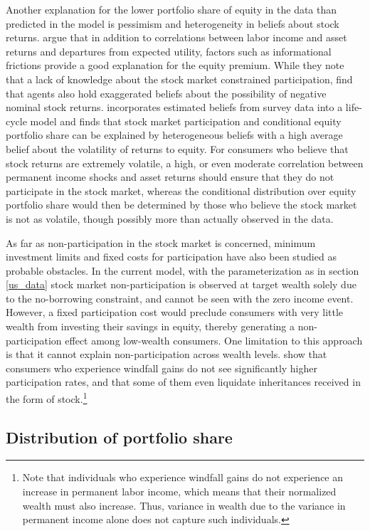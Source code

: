 Another explanation for the lower portfolio share of equity in the data than predicted in the model is pessimism and heterogeneity in beliefs about stock returns. \citet{Haliassos1995} argue that in addition to correlations between labor income and asset returns and departures from expected utility, factors such as informational frictions provide a good explanation for the equity premium. While they note that a lack of knowledge about the stock market constrained participation, \citet{Dominitz2007} find that agents also hold exaggerated beliefs about the possibility of negative nominal stock returns. \citet{Mateo2024} incorporates estimated beliefs from survey data into a life-cycle model and finds that stock market participation and conditional equity portfolio share can be explained by heterogeneous beliefs with a high average belief about the volatility of returns to equity. For consumers who believe that stock returns are extremely volatile, a high, or even moderate correlation between permanent income shocks and asset returns should ensure that they do not participate in the stock market, whereas the conditional distribution over equity portfolio share would then be determined by those who believe the stock market is not as volatile, though possibly more than actually observed in the data.

As far as non-participation in the stock market is concerned, minimum investment limits and fixed costs for participation have also been studied as probable obstacles. In the current model, with the parameterization as in section \ref{us_data} stock market non-participation is observed at target wealth solely due to the no-borrowing constraint, and cannot be seen with the zero income event. However, a fixed participation cost would preclude consumers with very little wealth from investing their savings in equity, thereby generating a non-participation effect among low-wealth consumers. One limitation to this approach is that it cannot explain non-participation across wealth levels. \citet{Andersen2011,Briggs2021} show that consumers who experience windfall gains do not see significantly higher participation rates, and that some of them even liquidate inheritances received in the form of stock.\footnote{Note that individuals who experience windfall gains do not experience an increase in permanent labor income, which means that their normalized wealth must also increase. Thus, variance in wealth due to the variance in permanent income alone does not capture such individuals.}

\subsection{Distribution of portfolio share}

